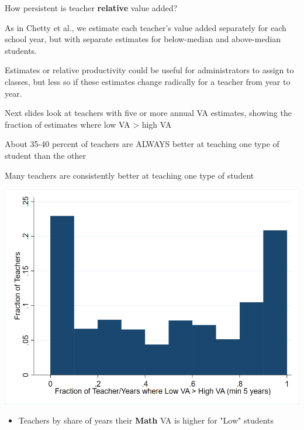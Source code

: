 \documentclass[t,aspectratio=169,11pt]{beamer}
\begin{document}
\begin{frame}{How persistent is teacher \textbf{relative} value added?}

\vfill
\begin{wideitemize}
    \item As in Chetty et al., we estimate each teacher's value added separately for each school year, but with separate estimates for below-median and above-median students.

    \item<2-> Estimates or relative productivity could be useful for administrators to assign to classes, but less so if these estimates change radically for a teacher from year to year.

    \item<3-> Next slides look at teachers with five or more annual VA estimates, showing the fraction of estimates where low VA > high VA
    \item<4-> About 35-40 percent of teachers are ALWAYS better at teaching one type of student than the other
        
\end{wideitemize}
\vfill

\end{frame}


\begin{frame}[c, label=math_bin_diff]{Many teachers are consistently better at teaching one type of student}
\begin{center}


\includegraphics[width=.65\textwidth]{Working_Paper/WP_Figures/Math_Bin_Diff.png}
\begin{itemize}
    \item Teachers by share of years their \textbf{Math} VA is higher for "Low" students \hyperlink{ela_bin_diff}{}
\end{itemize}
\end{center}

\end{frame}
\end{document}
